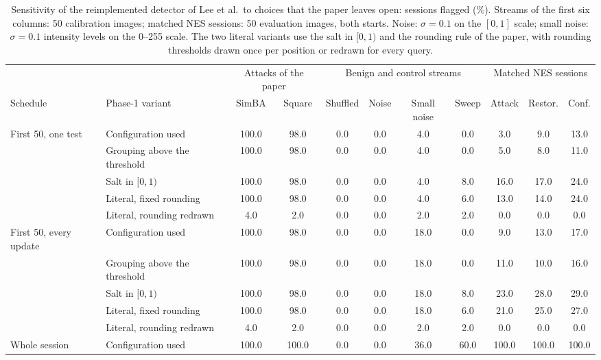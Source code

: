 \begin{table}
\centering\small\setlength{\tabcolsep}{5pt}
\caption{Sensitivity of the reimplemented detector of Lee et al.\ to choices that the paper leaves open: sessions flagged (\%). Streams of the first six columns: 50 calibration images; matched NES sessions: 50 evaluation images, both starts. Noise: $\sigma=0.1$ on the $[0,1]$ scale; small noise: $\sigma=0.1$ intensity levels on the 0--255 scale. The two literal variants use the salt in $[0,1)$ and the rounding rule of the paper, with rounding thresholds drawn once per position or redrawn for every query.}
\label{tab:sensitivity}
\vspace{3pt}
\begin{adjustbox}{max width=\textheight}
\begin{tabular}{llccccccccc}
\toprule
& & \multicolumn{2}{c}{Attacks of the paper} & \multicolumn{4}{c}{Benign and control streams} & \multicolumn{3}{c}{Matched NES sessions} \\
\cmidrule(lr){3-4}\cmidrule(lr){5-8}\cmidrule(lr){9-11}
Schedule & Phase-1 variant & SimBA & Square & Shuffled & Noise & Small noise & Sweep & Attack & Restor. & Conf. \\
\midrule
First 50, one test & Configuration used & 100.0 & 98.0 & 0.0 & 0.0 & 4.0 & 0.0 & 3.0 & 9.0 & 13.0 \\
 & Grouping above the threshold & 100.0 & 98.0 & 0.0 & 0.0 & 4.0 & 0.0 & 5.0 & 8.0 & 11.0 \\
 & Salt in $[0,1)$ & 100.0 & 98.0 & 0.0 & 0.0 & 4.0 & 8.0 & 16.0 & 17.0 & 24.0 \\
 & Literal, fixed rounding & 100.0 & 98.0 & 0.0 & 0.0 & 4.0 & 6.0 & 13.0 & 14.0 & 24.0 \\
 & Literal, rounding redrawn & 4.0 & 2.0 & 0.0 & 0.0 & 2.0 & 2.0 & 0.0 & 0.0 & 0.0 \\[2pt]
First 50, every update & Configuration used & 100.0 & 98.0 & 0.0 & 0.0 & 18.0 & 0.0 & 9.0 & 13.0 & 17.0 \\
 & Grouping above the threshold & 100.0 & 98.0 & 0.0 & 0.0 & 18.0 & 0.0 & 11.0 & 10.0 & 16.0 \\
 & Salt in $[0,1)$ & 100.0 & 98.0 & 0.0 & 0.0 & 18.0 & 8.0 & 23.0 & 28.0 & 29.0 \\
 & Literal, fixed rounding & 100.0 & 98.0 & 0.0 & 0.0 & 18.0 & 6.0 & 21.0 & 25.0 & 27.0 \\
 & Literal, rounding redrawn & 4.0 & 2.0 & 0.0 & 0.0 & 2.0 & 2.0 & 0.0 & 0.0 & 0.0 \\[2pt]
Whole session & Configuration used & 100.0 & 100.0 & 0.0 & 0.0 & 36.0 & 60.0 & 100.0 & 100.0 & 100.0 \\

\end{tabular}
\end{adjustbox}
\end{table}
